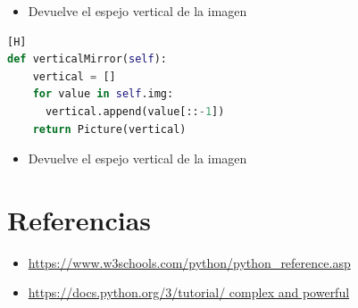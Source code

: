 \documentclass{article}
\begin{document}
	\begin{itemize}
		\item Devuelve el espejo vertical de la imagen 
	\end{itemize}
	\begin{lstlisting}[language=Python,caption={Función VerticalMirror()}][H]
def verticalMirror(self):
    vertical = []
    for value in self.img:
      vertical.append(value[::-1])
    return Picture(vertical)
	\end{lstlisting}
	\begin{itemize}
		\item Devuelve el espejo vertical de la imagen 
	\end{itemize}



	
\section{Referencias}
\begin{itemize}			
	\item \url{https://www.w3schools.com/python/python_reference.asp}
	\item\url{https://docs.python.org/3/tutorial/ complex and powerful}
\end{itemize}	
	
%
%
%
			
\end{document}
